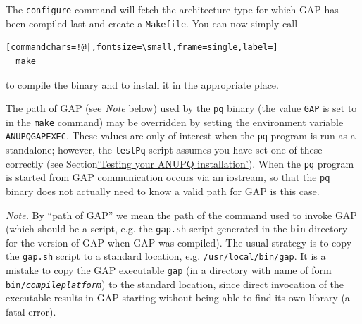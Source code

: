 \documentclass[a4paper,11pt]{report}
\begin{document}
{ The \texttt{configure} command will fetch the architecture type for which \textsf{GAP} has been compiled last and create a \texttt{Makefile}. You can now simply call 
\begin{Verbatim}[commandchars=!@|,fontsize=\small,frame=single,label=]
  make
\end{Verbatim}
 to compile the binary and to install it in the appropriate place. 

  The path of \textsf{GAP} (see \emph{Note} below) used by the \texttt{pq} binary (the value \texttt{GAP} is set to in the \texttt{make} command) may be over\texttt{}ridden by setting the environment
variable \texttt{ANUPQ{\textunderscore}GAP{\textunderscore}EXEC}. These values are only of interest when the \texttt{pq} program is run as a standalone; however, the \texttt{testPq} script assumes you have set one of these correctly (see Section{\nobreakspace}\hyperref[Testing your ANUPQ installation]{`Testing your ANUPQ installation'}). When the \texttt{pq} program is started from \textsf{GAP} communication occurs via an iostream, so that the \texttt{pq} binary does not actually need to know a valid path for \textsf{GAP} is this case. 

 \emph{Note.} By ``path of \textsf{GAP}'' we mean the path of the command used to invoke \textsf{GAP} (which should be a script, e.g. the \texttt{gap.sh} script generated in the \texttt{bin} directory for the version of \textsf{GAP} when \textsf{GAP} was compiled). The usual strategy is to copy the \texttt{gap.sh} script to a standard location, e.g. \texttt{/usr/local/bin/gap}. It is a mistake to copy the \textsf{GAP} executable \texttt{gap} (in a directory with name of form \texttt{bin/\mbox{\texttt{\mdseries\slshape compile\texttt{}platform}}}) to the standard location, since direct invocation of the executable results
in \textsf{GAP} starting without being able to find its own library (a fatal error). 
}
\end{document}
